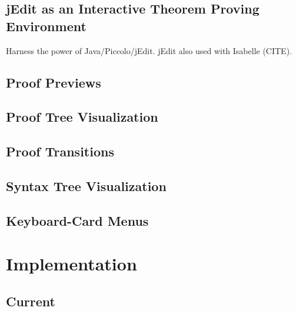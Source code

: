 \documentclass[11pt]{amsart}
\begin{document}
\subsection{jEdit as an Interactive Theorem Proving Environment}

Harness the power of Java/Piccolo/jEdit.  jEdit also used with Isabelle (CITE).

\subsection{Proof Previews}

\subsection{Proof Tree Visualization}

\subsection{Proof Transitions}

\subsection{Syntax Tree Visualization}

\subsection{Keyboard-Card Menus}

\section{Implementation}

\subsection{Current}
\end{document}
